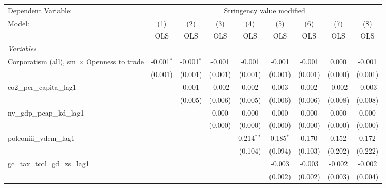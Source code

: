 
\begingroup
\centering
\begin{tabular}{lcccccccc}
   \toprule
   Dependent Variable: & \multicolumn{8}{c}{Stringency value modified}\\
   Model:                                            & (1)          & (2)          & (3)     & (4)          & (5)         & (6)     & (7)          & (8)\\  
                                                     &  OLS         & OLS          & OLS     & OLS          & OLS         & OLS     & OLS          & OLS\\  
   \midrule
   \emph{Variables}\\
   Corporatism (all), sm $\times$ Openness to trade  & -0.001$^{*}$ & -0.001$^{*}$ & -0.001  & -0.001       & -0.001      & -0.001  & 0.000        & -0.001\\   
                                                     & (0.001)      & (0.001)      & (0.001) & (0.001)      & (0.001)     & (0.001) & (0.000)      & (0.001)\\   
   co2\_per\_capita\_lag1                            &              & 0.001        & -0.002  & 0.002        & 0.003       & 0.002   & -0.002       & -0.003\\   
                                                     &              & (0.005)      & (0.006) & (0.005)      & (0.006)     & (0.006) & (0.008)      & (0.008)\\   
   ny\_gdp\_pcap\_kd\_lag1                           &              &              & 0.000   & 0.000        & 0.000       & 0.000   & 0.000        & 0.000\\   
                                                     &              &              & (0.000) & (0.000)      & (0.000)     & (0.000) & (0.000)      & (0.000)\\   
   polconiii\_vdem\_lag1                             &              &              &         & 0.214$^{**}$ & 0.185$^{*}$ & 0.170   & 0.152        & 0.172\\   
                                                     &              &              &         & (0.104)      & (0.094)     & (0.103) & (0.202)      & (0.222)\\   
   gc\_tax\_totl\_gd\_zs\_lag1                       &              &              &         &              & -0.003      & -0.003  & -0.002       & -0.002\\   
                                                     &              &              &         &              & (0.002)     & (0.002) & (0.003)      & (0.004)\\   

\end{tabular}
